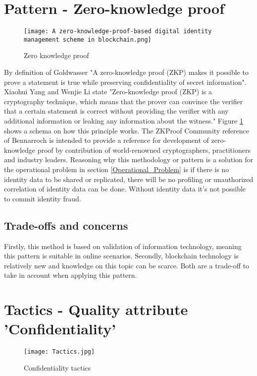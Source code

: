 \section{Pattern - Zero-knowledge proof}
\graphicspath{ {./images/} }
\begin{figure}[t]
\centering
\label{fig:ZKP}
\texttt{[image: A zero-knowledge-proof-based digital identity management scheme in blockchain.png]}\\
\caption{Zero knowledge proof}
\end{figure}
By definition of Goldwasser \etal \cite{Goldwasser} "A zero-knowledge proof (ZKP) makes it possible to prove a statement is true while preserving confidentiality of secret information". 
Xiaohui Yang and Wenjie Li \cite{YANG2020102050} state "Zero-knowledge proof (ZKP) is a cryptography technique,
which means that the prover can convince the verifier that a certain statement is correct without providing the verifier with any additional information or leaking any information about the witness." Figure \ref{fig:ZKP} shows a schema on how this principle works. The ZKProof Community reference \cite{2019:zkproof:community-reference-0.2} of Bennarroch \etal is intended to provide a reference for development of zero-knowledge proof by contribution of world-renowned cryptographers, practitioners and industry leaders.
Reasoning why this methodology or pattern is a solution for the operational problem in section \ref{Operational_Problem} is if there is no identity data to be shared or replicated, there will be no profiling or unauthorized correlation of identity data can be done. Without identity data it's not possible to commit identity fraud. 

\subsection{Trade-offs and concerns}
Firstly, this method is based on validation of information technology, meaning this pattern is suitable in online scenarios. Secondly, blockchain technology is relatively new and knowledge on this topic can be scarce. Both are a trade-off to take in account when applying this pattern. 

\section{Tactics - Quality attribute 'Confidentiality'}
\graphicspath{ {./images/} }
\begin{figure}[t]
\centering
\label{fig:Tactics}
\texttt{[image: Tactics.jpg]}\\
\caption{Confidentiality tactics}
\end{figure}

